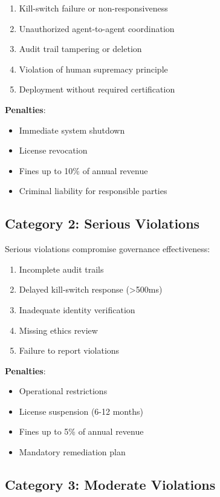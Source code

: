 \documentclass[12pt,a4paper,twoside,openright]{book}
\begin{document}
\begin{enumerate}
    \item Kill-switch failure or non-responsiveness
    \item Unauthorized agent-to-agent coordination
    \item Audit trail tampering or deletion
    \item Violation of human supremacy principle
    \item Deployment without required certification
\end{enumerate}

\textbf{Penalties}:
\begin{itemize}
    \item Immediate system shutdown
    \item License revocation
    \item Fines up to 10\% of annual revenue
    \item Criminal liability for responsible parties
\end{itemize}

\subsection{Category 2: Serious Violations}

Serious violations compromise governance effectiveness:

\begin{enumerate}
    \item Incomplete audit trails
    \item Delayed kill-switch response (>500ms)
    \item Inadequate identity verification
    \item Missing ethics review
    \item Failure to report violations
\end{enumerate}

\textbf{Penalties}:
\begin{itemize}
    \item Operational restrictions
    \item License suspension (6-12 months)
    \item Fines up to 5\% of annual revenue
    \item Mandatory remediation plan
\end{itemize}

\subsection{Category 3: Moderate Violations}
\end{document}
